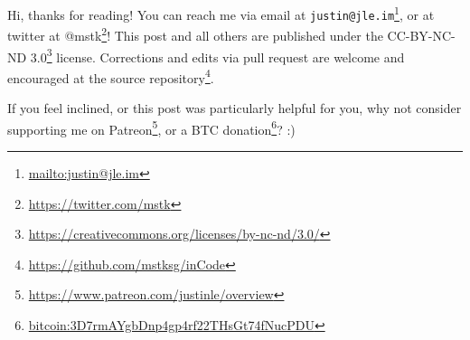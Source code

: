 \documentclass[]{article}
\renewcommand{\href}[2]{#2\footnote{\url{#1}}}
\begin{document}
Hi, thanks for reading! You can reach me via email at
\href{mailto:justin@jle.im}{\nolinkurl{justin@jle.im}}, or at twitter at
\href{https://twitter.com/mstk}{@mstk}! This post and all others are published
under the \href{https://creativecommons.org/licenses/by-nc-nd/3.0/}{CC-BY-NC-ND
3.0} license. Corrections and edits via pull request are welcome and encouraged
at \href{https://github.com/mstksg/inCode}{the source repository}.

If you feel inclined, or this post was particularly helpful for you, why not
consider \href{https://www.patreon.com/justinle/overview}{supporting me on
Patreon}, or a \href{bitcoin:3D7rmAYgbDnp4gp4rf22THsGt74fNucPDU}{BTC donation}?
:)
\end{document}
